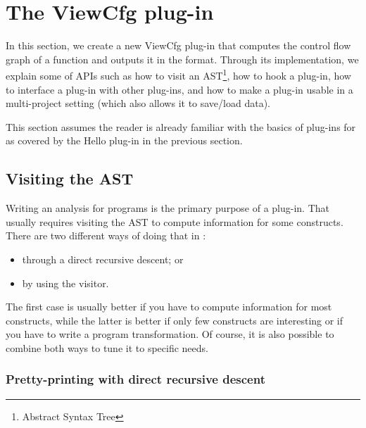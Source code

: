 
\section{The ViewCfg plug-in}\label{tut2:cfg}

In this section, we create a new ViewCfg plug-in that computes the control
flow graph of a function and outputs it in the \dottool format. Through its
implementation, we explain some of \framac APIs such as how to visit
an AST\footnote{Abstract Syntax Tree}, how to hook a plug-in, how to interface
a plug-in with other plug-ins, and how to make a plug-in usable in a
multi-project setting (which also allows it to save/load data).

This section assumes the reader is already familiar with the basics of plug-ins
for \framac as covered by the Hello plug-in in the previous
section.

\subsection{Visiting the AST}\label{tut2:visitor}

Writing an analysis for \C programs is the primary purpose of a \framac
plug-in. That usually requires visiting the AST to compute information for some
\C constructs. There are two different ways of doing that in \framac:
\begin{itemize}
\item through a direct recursive descent; or
\item by using the \framac visitor.
\end{itemize}
The first case is usually better if you have to compute information for most \C
constructs, while the latter is better if only few \C constructs are interesting
or if you have to write a program transformation. Of course, it is also possible
to combine both ways to tune it to specific needs.

\subsubsection*{Pretty-printing with direct recursive descent}


